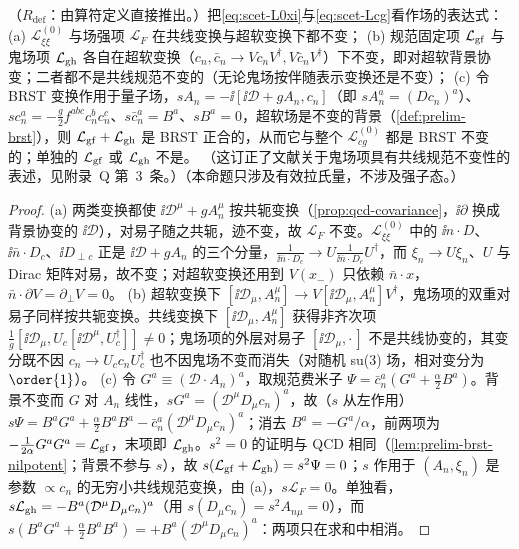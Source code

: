 \begin{proposition}\label{prop:scet-gauge}
（$R_{\mathrm{def}}$：由算符定义直接推出。）把\cref{eq:scet-L0xi}与\cref{eq:scet-Lcg}看作场的表达式：
(a) $\mathcal L^{(0)}_{\xi\xi}$ 与场强项 $\mathcal L_F$ 在共线变换与超软变换下都不变；
(b) 规范固定项 $\mathcal L_{\rm gf}$ 与鬼场项 $\mathcal L_{\rm gh}$ 各自在超软变换（$c_n,\bar c_n\to Vc_nV^\dagger,V\bar c_nV^\dagger$）下不变，即对超软背景协变；二者都不是共线规范不变的（无论鬼场按伴随表示变换还是不变）；
(c) 令 BRST 变换作用于量子场，$sA_n=-\ii[\ii\mathcal D+gA_n,c_n]$（即 $sA^a_n=(Dc_n)^a$）、$sc_n^a=-\frac g2f^{abc}c_n^bc_n^c$、$s\bar c_n^a=B^a$、$sB^a=0$，超软场是不变的背景（\cref{def:prelim-brst}），则 $\mathcal L_{\rm gf}+\mathcal L_{\rm gh}$ 是 BRST 正合的，从而它与整个 $\mathcal L^{(0)}_{cg}$ 都是 BRST 不变的；单独的 $\mathcal L_{\rm gf}$ 或 $\mathcal L_{\rm gh}$ 不是。
（这订正了文献\cite[式~(24) 之后]{BauerPirjolStewart2002}关于鬼场项具有共线规范不变性的表述，见附录~Q 第~3~条。）（本命题只涉及有效拉氏量，不涉及强子态。）
\end{proposition}

\begin{proof}
(a) 两类变换都使 $\ii\mathcal D^\mu+gA_n^\mu$ 按共轭变换（\cref{prop:qcd-covariance}，$\ii\partial$ 换成背景协变的 $\ii\mathcal D$），对易子随之共轭，迹不变，故 $\mathcal L_F$ 不变。$\mathcal L^{(0)}_{\xi\xi}$ 中的 $\ii n\cdot D$、$\ii\bar n\cdot D_c$、$\ii D_{\perp c}$ 正是 $\ii\mathcal D+gA_n$ 的三个分量，$\frac1{\ii\bar n\cdot D_c}\to U\frac1{\ii\bar n\cdot D_c}U^\dagger$，而 $\xi_n\to U\xi_n$、$U$ 与 Dirac 矩阵对易，故不变；对超软变换还用到 $V(x_-)$ 只依赖 $\bar n\cdot x$，$\bar n\cdot\partial V=\partial_\perp V=0$。
(b) 超软变换下 $[\ii\mathcal D_\mu,A_n^\mu]\to V[\ii\mathcal D_\mu,A_n^\mu]V^\dagger$，鬼场项的双重对易子同样按共轭变换。共线变换下 $[\ii\mathcal D_\mu,A_n^\mu]$ 获得非齐次项 $\frac1g[\ii\mathcal D_\mu,U_c[\ii\mathcal D^\mu,U_c^\dagger]]\neq0$；鬼场项的外层对易子 $[\ii\mathcal D_\mu,\cdot\,]$ 不是共线协变的，其变分既不因 $c_n\to U_cc_nU_c^\dagger$ 也不因鬼场不变而消失（对随机 su(3) 场，相对变分为 $\order{1}$）。%
(c) 令 $G^a\equiv(\mathcal D\cdot A_n)^a$，取规范费米子 $\Psi=\bar c_n^a(G^a+\frac\alpha2B^a)$。背景不变而 $G$ 对 $A_n$ 线性，$sG^a=(\mathcal D^\mu D_\mu c_n)^a$，故（$s$ 从左作用）$s\Psi=B^aG^a+\frac\alpha2B^aB^a-\bar c_n^a(\mathcal D^\mu D_\mu c_n)^a$；消去 $B^a=-G^a/\alpha$，前两项为 $-\frac1{2\alpha}G^aG^a=\mathcal L_{\rm gf}$，末项即 $\mathcal L_{\rm gh}$。$s^2=0$ 的证明与 QCD 相同（\cref{lem:prelim-brst-nilpotent}；背景不参与 $s$），故 $s(\mathcal L_{\rm gf}+\mathcal L_{\rm gh})=s^2\Psi=0$；$s$ 作用于 $(A_n,\xi_n)$ 是参数 $\propto c_n$ 的无穷小共线规范变换，由 (a)，$s\mathcal L_F=0$。单独看，$s\mathcal L_{\rm gh}=-B^a(\mathcal D^\mu D_\mu c_n)^a$（用 $s(D_\mu c_n)=s^2A_{n\mu}=0$），而 $s(B^aG^a+\frac\alpha2B^aB^a)=+B^a(\mathcal D^\mu D_\mu c_n)^a$：两项只在求和中相消。
\end{proof}

